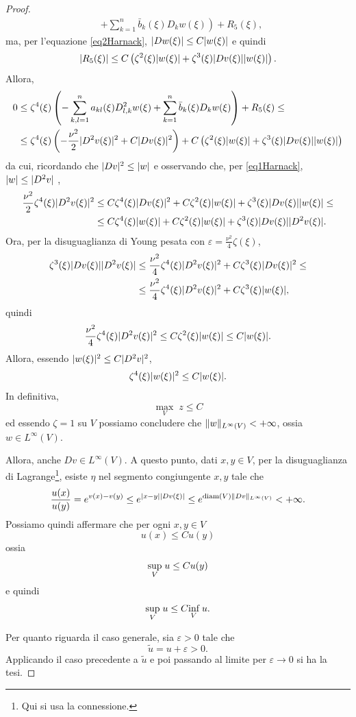 \begin{proof}
\begin{align*}
		& +\left.\sum_{k=1}^n \bar{b}_k(\xi) D_k w(\xi)\right) +R_5(\xi),
	\end{align*}
	ma, per l'equazione \eqref{eq2Harnack}, $\lvert Dw(\xi)\rvert \le C \lvert w(\xi)\rvert$ e quindi 
	\[ \lvert R_5(\xi)\rvert \le C \left( \zeta^2(\xi)\lvert w(\xi)\rvert + \zeta^3(\xi)\lvert Dv(\xi)\rvert\lvert w(\xi)\rvert\right). \]
	Allora,
	\begin{align*}
		0 &\le \zeta^4(\xi)\left(-\sum_{k,l=1}^n a_{kl}(\xi) D^2_{l,k}w(\xi) +\sum_{k=1}^n \bar{b}_k(\xi) D_k w(\xi)\right) +R_5(\xi) \le \\
		&\le \zeta^4(\xi)\left( -\frac{\nu^2}{2}\lvert D^2 v(\xi)\rvert^2 + C\lvert Dv(\xi)\rvert^2\right) + C \left( \zeta^2(\xi)\lvert w(\xi)\rvert + \zeta^3(\xi)\lvert Dv(\xi)\rvert\lvert w(\xi)\rvert\right)
	\end{align*}
	da cui, ricordando che $\lvert Dv\rvert^2 \le \lvert w\rvert$ e osservando che, per \eqref{eq1Harnack}, $\lvert w\rvert\le \lvert D^2v\rvert$ ,
	\begin{align*}
		\frac{\nu^2}{2}\zeta^4(\xi) \lvert D^2v(\xi)\rvert^2 &\le C\zeta^4(\xi) \lvert Dv(\xi)\rvert^2 + C\zeta^2(\xi)\lvert w(\xi)\rvert+\zeta^3(\xi)\lvert Dv(\xi)\rvert\lvert w(\xi)\rvert \le \\
		&\le C\zeta^4(\xi) \lvert w(\xi)\rvert + C\zeta^2(\xi)\lvert w(\xi)\rvert+\zeta^3(\xi)\lvert Dv(\xi)\rvert\lvert D^2v(\xi)\rvert.
	\end{align*}
	Ora, per la disuguaglianza di Young pesata con $\varepsilon = \frac{\nu^2}{4}\zeta(\xi)$,
	\begin{align*}
		\zeta^3(\xi)\lvert Dv(\xi)\rvert\lvert D^2v(\xi)\rvert &\le \frac{\nu^2}{4}\zeta^4(\xi) \lvert D^2v(\xi)\rvert^2 + C\zeta^3(\xi)\lvert Dv(\xi)\rvert^2 \le \\
		&\le \frac{\nu^2}{4}\zeta^4(\xi) \lvert D^2v(\xi)\rvert^2 + C\zeta^3(\xi)\lvert w(\xi)\rvert,
	\end{align*}
	quindi
	\[ \frac{\nu^2}{4}\zeta^4(\xi) \lvert D^2v(\xi)\rvert^2 \le C\zeta^2(\xi)\lvert w(\xi)\rvert \le C\lvert w(\xi)\rvert. \]
	Allora, essendo $\lvert w(\xi)\rvert^2\le C\lvert D^2v\rvert^2$,
	\[ \zeta^4(\xi)\lvert w(\xi)\rvert^2 \le C\lvert w(\xi)\rvert. \]
	In definitiva, 
	\[ \underset{V}{\max} \; z \le C\]
	ed essendo $\zeta = 1$ su $V$ possiamo concludere che $\lVert w\rVert_{L^\infty(V)} < +\infty$, ossia $w \in L^\infty(V)$. 
	
	Allora, anche $Dv \in L^\infty(V)$. A questo punto, dati $x,y \in V$, per la disuguaglianza di Lagrange\footnote{Qui si usa la connessione.}, esiste $\eta$ nel segmento congiungente $x,y$ tale che
	\[ \frac{u(x)}{u(y)} = e^{v(x)-v(y)} \le e^{\lvert x-y\rvert\lvert Dv(\xi)\rvert} \le e^{\textup{diam}(V)\lVert Dv\rVert_{L^\infty(V)}} < +\infty.  \]
	Possiamo quindi affermare che per ogni $x,y \in V$
	\[ u(x) \le C u(y) \]
	ossia 
	\[ \underset{V}{\textup{sup}}\; u \le Cu(y) \]
	e quindi 
	\[ \underset{V}{\textup{sup}}\; u \le C  \underset{V}{\textup{inf}}\; u.\]
	
	Per quanto riguarda il caso generale, sia $\varepsilon >0 $ tale che 
	\[ \tilde{u} = u + \varepsilon >0. \]
	Applicando il caso precedente a $\tilde{u}$ e poi passando al limite per $\varepsilon \to 0$ si ha la tesi.
\end{proof}
